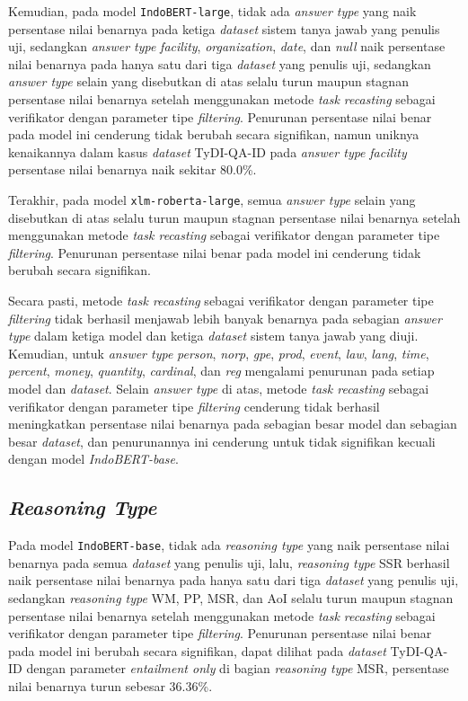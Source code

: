 Kemudian, pada model \texttt{IndoBERT-large}, tidak ada \emph{answer type} yang naik persentase nilai benarnya pada ketiga \emph{dataset} sistem tanya jawab yang penulis uji, sedangkan \emph{answer type} \emph{facility}, \emph{organization}, \emph{date}, dan \emph{null} naik persentase nilai benarnya pada hanya satu dari tiga \emph{dataset} yang penulis uji, sedangkan \emph{answer type} selain yang disebutkan di atas selalu turun maupun stagnan persentase nilai benarnya setelah menggunakan metode \emph{task recasting} sebagai verifikator dengan parameter tipe \emph{filtering}. Penurunan persentase nilai benar pada model ini cenderung tidak berubah secara signifikan, namun uniknya kenaikannya dalam kasus \emph{dataset} TyDI-QA-ID pada \emph{answer type} \emph{facility} persentase nilai benarnya naik sekitar 80.0\%.

Terakhir, pada model \texttt{xlm-roberta-large}, semua \emph{answer type} selain yang disebutkan di atas selalu turun maupun stagnan persentase nilai benarnya setelah menggunakan metode \emph{task recasting} sebagai verifikator dengan parameter tipe \emph{filtering}. Penurunan persentase nilai benar pada model ini cenderung tidak berubah secara signifikan.

Secara pasti, metode \emph{task recasting} sebagai verifikator dengan parameter tipe \emph{filtering} tidak berhasil menjawab lebih banyak benarnya pada sebagian \emph{answer type} dalam ketiga model dan ketiga \emph{dataset} sistem tanya jawab yang diuji. Kemudian, untuk \emph{answer type} \emph{person}, \emph{norp}, \emph{gpe}, \emph{prod}, \emph{event}, \emph{law}, \emph{lang}, \emph{time}, \emph{percent}, \emph{money}, \emph{quantity}, \emph{cardinal}, dan \emph{reg} mengalami penurunan pada setiap model dan \emph{dataset}. Selain \emph{answer type} di atas, metode \emph{task recasting} sebagai verifikator dengan parameter tipe \emph{filtering} cenderung tidak berhasil meningkatkan persentase nilai benarnya pada sebagian besar model dan sebagian besar \emph{dataset}, dan penurunannya ini cenderung untuk tidak signifikan kecuali dengan model \emph{IndoBERT-base}. 

\subsection{\emph{Reasoning Type}}
Pada model \texttt{IndoBERT-base}, tidak ada \emph{reasoning type} yang naik persentase nilai benarnya pada semua \emph{dataset} yang penulis uji, lalu, \emph{reasoning type} SSR berhasil naik persentase nilai benarnya pada hanya satu dari tiga \emph{dataset} yang penulis uji, sedangkan \emph{reasoning type} WM, PP, MSR, dan AoI selalu turun maupun stagnan persentase nilai benarnya setelah menggunakan metode \emph{task recasting} sebagai verifikator dengan parameter tipe \emph{filtering}. Penurunan persentase nilai benar pada model ini berubah secara signifikan, dapat dilihat pada \emph{dataset} TyDI-QA-ID  dengan parameter \emph{entailment only} di bagian \emph{reasoning type} MSR, persentase nilai benarnya turun sebesar 36.36\%.

